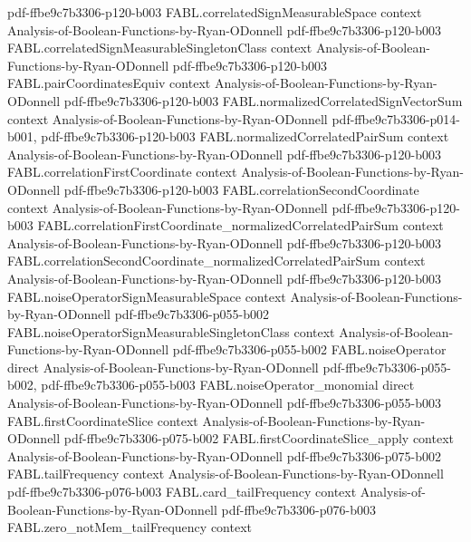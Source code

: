 \begin{theorem}
  {pdf-ffbe9c7b3306-p120-b003}
\proofstep
  {FABL.correlatedSignMeasurableSpace}
  {context}
  {Analysis-of-Boolean-Functions-by-Ryan-ODonnell}
  {pdf-ffbe9c7b3306-p120-b003}
\proofstep
  {FABL.correlatedSignMeasurableSingletonClass}
  {context}
  {Analysis-of-Boolean-Functions-by-Ryan-ODonnell}
  {pdf-ffbe9c7b3306-p120-b003}
\proofstep
  {FABL.pairCoordinatesEquiv}
  {context}
  {Analysis-of-Boolean-Functions-by-Ryan-ODonnell}
  {pdf-ffbe9c7b3306-p120-b003}
\proofstep
  {FABL.normalizedCorrelatedSignVectorSum}
  {context}
  {Analysis-of-Boolean-Functions-by-Ryan-ODonnell}
  {pdf-ffbe9c7b3306-p014-b001,
    pdf-ffbe9c7b3306-p120-b003}
\proofstep
  {FABL.normalizedCorrelatedPairSum}
  {context}
  {Analysis-of-Boolean-Functions-by-Ryan-ODonnell}
  {pdf-ffbe9c7b3306-p120-b003}
\proofstep
  {FABL.correlationFirstCoordinate}
  {context}
  {Analysis-of-Boolean-Functions-by-Ryan-ODonnell}
  {pdf-ffbe9c7b3306-p120-b003}
\proofstep
  {FABL.correlationSecondCoordinate}
  {context}
  {Analysis-of-Boolean-Functions-by-Ryan-ODonnell}
  {pdf-ffbe9c7b3306-p120-b003}
\proofstep
  {FABL.correlationFirstCoordinate_normalizedCorrelatedPairSum}
  {context}
  {Analysis-of-Boolean-Functions-by-Ryan-ODonnell}
  {pdf-ffbe9c7b3306-p120-b003}
\proofstep
  {FABL.correlationSecondCoordinate_normalizedCorrelatedPairSum}
  {context}
  {Analysis-of-Boolean-Functions-by-Ryan-ODonnell}
  {pdf-ffbe9c7b3306-p120-b003}
\proofstep
  {FABL.noiseOperatorSignMeasurableSpace}
  {context}
  {Analysis-of-Boolean-Functions-by-Ryan-ODonnell}
  {pdf-ffbe9c7b3306-p055-b002}
\proofstep
  {FABL.noiseOperatorSignMeasurableSingletonClass}
  {context}
  {Analysis-of-Boolean-Functions-by-Ryan-ODonnell}
  {pdf-ffbe9c7b3306-p055-b002}
\proofstep
  {FABL.noiseOperator}
  {direct}
  {Analysis-of-Boolean-Functions-by-Ryan-ODonnell}
  {pdf-ffbe9c7b3306-p055-b002,
    pdf-ffbe9c7b3306-p055-b003}
\proofstep
  {FABL.noiseOperator_monomial}
  {direct}
  {Analysis-of-Boolean-Functions-by-Ryan-ODonnell}
  {pdf-ffbe9c7b3306-p055-b003}
\proofstep
  {FABL.firstCoordinateSlice}
  {context}
  {Analysis-of-Boolean-Functions-by-Ryan-ODonnell}
  {pdf-ffbe9c7b3306-p075-b002}
\proofstep
  {FABL.firstCoordinateSlice_apply}
  {context}
  {Analysis-of-Boolean-Functions-by-Ryan-ODonnell}
  {pdf-ffbe9c7b3306-p075-b002}
\proofstep
  {FABL.tailFrequency}
  {context}
  {Analysis-of-Boolean-Functions-by-Ryan-ODonnell}
  {pdf-ffbe9c7b3306-p076-b003}
\proofstep
  {FABL.card_tailFrequency}
  {context}
  {Analysis-of-Boolean-Functions-by-Ryan-ODonnell}
  {pdf-ffbe9c7b3306-p076-b003}
\proofstep
  {FABL.zero_notMem_tailFrequency}
  {context}

\end{theorem}
